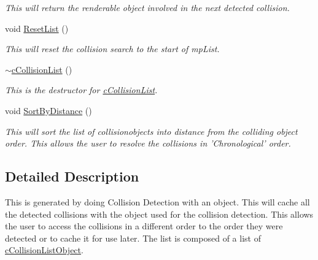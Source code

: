 \begin{DoxyCompactItemize}
\begin{DoxyCompactList}\small\item\em This will return the renderable object involved in the next detected collision. \end{DoxyCompactList}\item 
\hypertarget{classc_collision_list_ac04316a4e8d0e3c5c3213c20bd7897cc}{
void \hyperlink{classc_collision_list_ac04316a4e8d0e3c5c3213c20bd7897cc}{ResetList} ()}
\label{classc_collision_list_ac04316a4e8d0e3c5c3213c20bd7897cc}

\begin{DoxyCompactList}\small\item\em This will reset the collision search to the start of mpList. \end{DoxyCompactList}\item 
\hypertarget{classc_collision_list_a628ed6510cd89c192a402be0a64ea111}{
\hyperlink{classc_collision_list_a628ed6510cd89c192a402be0a64ea111}{$\sim$cCollisionList} ()}
\label{classc_collision_list_a628ed6510cd89c192a402be0a64ea111}

\begin{DoxyCompactList}\small\item\em This is the destructor for \hyperlink{classc_collision_list}{cCollisionList}. \end{DoxyCompactList}\item 
\hypertarget{classc_collision_list_ae279c0239ead11e2d6c3647495347cc4}{
void \hyperlink{classc_collision_list_ae279c0239ead11e2d6c3647495347cc4}{SortByDistance} ()}
\label{classc_collision_list_ae279c0239ead11e2d6c3647495347cc4}

\begin{DoxyCompactList}\small\item\em This will sort the list of collisionobjects into distance from the colliding object order. This allows the user to resolve the collisions in 'Chronological' order. \end{DoxyCompactList}\end{DoxyCompactItemize}


\subsection{Detailed Description}
This is generated by doing Collision Detection with an object. This will cache all the detected collisions with the object used for the collision detection. This allows the user to access the collisions in a different order to the order they were detected or to cache it for use later. The list is composed of a list of \hyperlink{classc_collision_list_object}{cCollisionListObject}. 